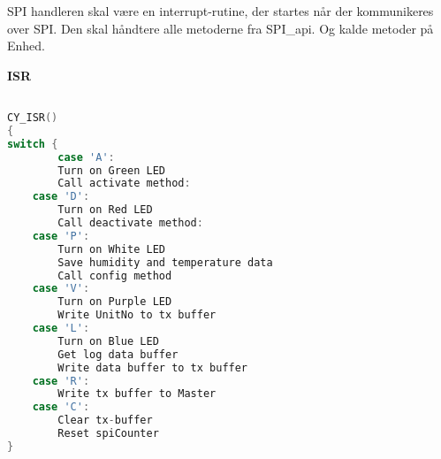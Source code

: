 
SPI handleren skal være en interrupt-rutine, der startes når der kommunikeres over SPI. Den skal håndtere alle metoderne fra SPI\_api. Og kalde metoder på Enhed.

\textbf{ISR}

\begin{lstlisting}[language=C]

CY_ISR()
{
switch {
    	case 'A':
		Turn on Green LED
		Call activate method:                
	case 'D':
		Turn on Red LED
		Call deactivate method:  
	case 'P':
		Turn on White LED			
		Save humidity and temperature data            
		Call config method
	case 'V':
		Turn on Purple LED  
		Write UnitNo to tx buffer  
	case 'L':
		Turn on Blue LED
		Get log data buffer
		Write data buffer to tx buffer
	case 'R':
		Write tx buffer to Master
	case 'C':
		Clear tx-buffer
		Reset spiCounter 
}
\end{lstlisting}